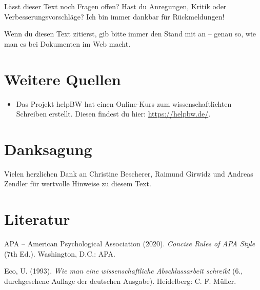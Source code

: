 \documentclass{../cssheet}
\begin{document}
Lässt dieser Text noch Fragen offen? Hast du Anregungen, Kritik oder
Verbesserungsvorschläge? Ich bin immer dankbar für Rückmeldungen!

Wenn du diesen Text zitierst, gib bitte immer den Stand mit an --
genau so, wie man es bei Dokumenten im Web macht.

\section{Weitere Quellen}

\begin{itemize}
\item Das Projekt helpBW hat einen Online-Kurs zum wissenschaftlichten Schreiben erstellt. Diesen findest du hier: \url{https://helpbw.de/}.
\end{itemize}

\section{Danksagung}

Vielen herzlichen Dank an Christine Bescherer, Raimund Girwidz und
Andreas Zendler für wertvolle Hinweise zu diesem Text.

\section{Literatur}

APA -- American Psychological Association (2020). \emph{Concise Rules of APA Style} (7th Ed.). Washington, D.C.: APA.

Eco, U. (1993). \emph{Wie man eine wissenschaftliche Abschlussarbeit schreibt} (6., durchgesehene Auflage der deutschen Ausgabe). Heidelberg: C. F.
Müller.

\vspace*{10mm}

\printlicense

\printsocials
\end{document}
